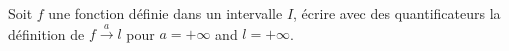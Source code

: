 Soit $f$ une fonction d\'efinie dans un intervalle $I$, \'ecrire avec des quantificateurs la d\'efinition de
$f\stackrel{a}{\rightarrow}l$ pour $a= +\infty$ and $l= +\infty$. \bigskip